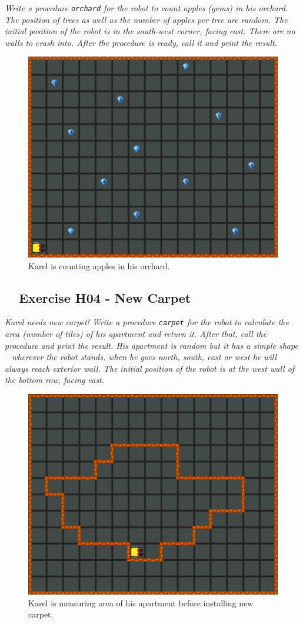 \documentclass[article,A4,12pt]{llncs}
\begin{document}
{{{{{\em Write a procedure {\tt orchard} for the robot to count apples (gems) in his orchard. The position of 
trees as well as the number of apples per tree are random. The initial position of the robot is 
in the south-west corner, facing east. There are no walls
to crash into. After the procedure is ready, call it and print the result.}

\begin{figure}[!ht]
\begin{center}
\includegraphics[height=0.4\textwidth]{img/h03.png}
\end{center}
\vspace{-4mm}
\caption{Karel is counting apples in his orchard.}
\label{fig:h03}
\vspace{-4mm}
\end{figure}
\noindent

\subsection{\ \ Exercise H04 - New Carpet}

{\em Karel needs new carpet! Write a procedure {\tt carpet} for the robot to calculate 
the area (number of tiles) of his apartment and return it. After that, call the procedure 
and print the result. His apartment is random but it has a simple shape -- wherever 
the robot stands, when he goes north, south, east or west he will always reach exterior wall.
The initial position of the robot is at the west wall of the bottom row, facing east.}
\newpage
\begin{figure}[!ht]
\begin{center}
\includegraphics[height=0.4\textwidth]{img/h04.png}
\end{center}
\vspace{-4mm}
\caption{Karel is measuring area of his apartment before installing new carpet.}
\label{fig:h04}
\vspace{-4mm}
\end{figure}
\noindent

}}}}
\end{document}
